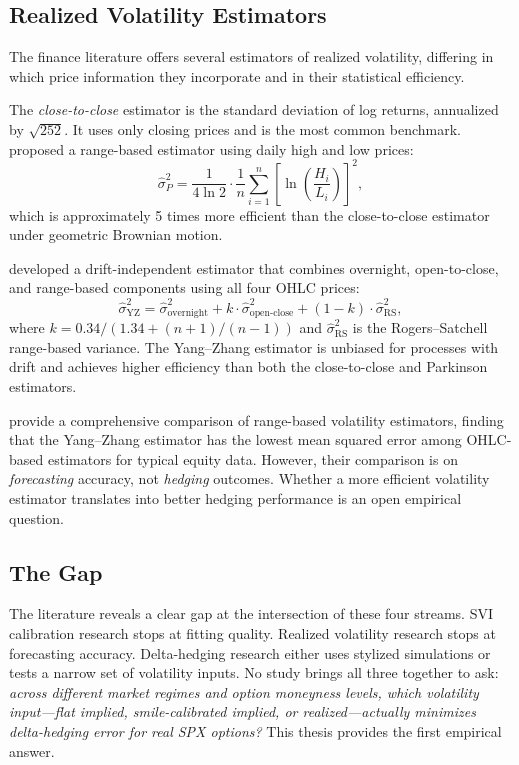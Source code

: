 \documentclass[12pt, letterpaper]{article}
\begin{document}
\subsection{Realized Volatility Estimators}

The finance literature offers several estimators of realized volatility, differing in which price information they incorporate and in their statistical efficiency.

The \textit{close-to-close} estimator is the standard deviation of log returns, annualized by $\sqrt{252}$. It uses only closing prices and is the most common benchmark. \citet{Parkinson1980} proposed a range-based estimator using daily high and low prices:
\begin{equation}
    \hat{\sigma}_P^2 = \frac{1}{4 \ln 2} \cdot \frac{1}{n} \sum_{i=1}^{n} \left[\ln\left(\frac{H_i}{L_i}\right)\right]^2,
    \label{eq:parkinson}
\end{equation}
which is approximately 5 times more efficient than the close-to-close estimator under geometric Brownian motion.

\citet{Yang2000} developed a drift-independent estimator that combines overnight, open-to-close, and range-based components using all four OHLC prices:
\begin{equation}
    \hat{\sigma}_{\text{YZ}}^2 = \hat{\sigma}_{\text{overnight}}^2 + k \cdot \hat{\sigma}_{\text{open-close}}^2 + (1 - k) \cdot \hat{\sigma}_{\text{RS}}^2,
    \label{eq:yangzhang}
\end{equation}
where $k = 0.34 / (1.34 + (n+1)/(n-1))$ and $\hat{\sigma}_{\text{RS}}^2$ is the Rogers--Satchell range-based variance. The Yang--Zhang estimator is unbiased for processes with drift and achieves higher efficiency than both the close-to-close and Parkinson estimators.

\citet{Shu2006} provide a comprehensive comparison of range-based volatility estimators, finding that the Yang--Zhang estimator has the lowest mean squared error among OHLC-based estimators for typical equity data. However, their comparison is on \textit{forecasting} accuracy, not \textit{hedging} outcomes. Whether a more efficient volatility estimator translates into better hedging performance is an open empirical question.

\subsection{The Gap}

The literature reveals a clear gap at the intersection of these four streams. SVI calibration research stops at fitting quality. Realized volatility research stops at forecasting accuracy. Delta-hedging research either uses stylized simulations or tests a narrow set of volatility inputs. No study brings all three together to ask: \textit{across different market regimes and option moneyness levels, which volatility input---flat implied, smile-calibrated implied, or realized---actually minimizes delta-hedging error for real SPX options?} This thesis provides the first empirical answer.
\end{document}
